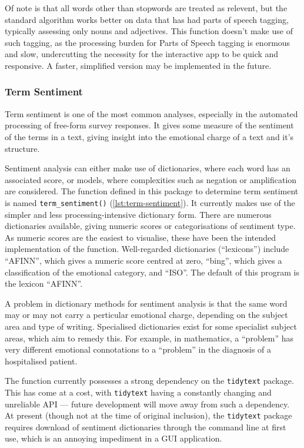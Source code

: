 \documentclass[11pt, a4paper, titlepage]{report}
\begin{document}
Of note is that all words other than stopwords are treated as
relevent, but the standard algorithm works better on data that has had
parts of speech tagging, typically assessing only nouns and
adjectives. This function doesn't make use of such tagging, as the
processing burden for Parts of Speech tagging is enormous and slow,
undercutting the necessity for the interactive app to be quick and
responsive. A faster, simplified version may be implemented in the
future.

\subsubsection{Term Sentiment}\label{sec:term-sentiment}

Term sentiment is one of the most common analyses, especially in the
automated processing of free-form survey responses. It gives some
measure of the sentiment of the terms in a text, giving insight into
the emotional charge of a text and it's structure.

Sentiment analysis can either make use of dictionaries, where each
word has an associated score, or models, where complexities such as
negation or amplification are considered. The function defined in this
package to determine term sentiment is named
\texttt{term_sentiment()}
(\underline{\cref{lst:term-sentiment}}). It currently makes use of the
simpler and less processing-intensive dictionary form. There are
numerous dictionaries available, giving numeric scores or
categorisations of sentiment type. As numeric scores are the easiest
to visualise, these have been the intended implementation of the
function. Well-regarded dictionaries (``lexicons'') include ``AFINN'',
which gives a numeric score centred at zero, ``bing'', which gives a
classification of the emotional category, and ``ISO''. The default of
this program is the lexicon ``AFINN''.

A problem in dictionary methods for sentiment analysis is that the
same word may or may not carry a perticular emotional charge,
depending on the subject area and type of writing. Specialised
dictionaries exist for some specialist subject areas, which aim to
remedy this. For example, in mathematics, a ``problem'' has very
different emotional connotations to a ``problem'' in the diagnosis of
a hospitalised patient.

The function currently possesses a strong dependency on the \texttt{tidytext}
package. This has come at a cost, with \texttt{tidytext} having a constantly
changing and unreliable API --- future development will move away from
such a dependency. At present (though not at the time of original
inclusion), the \texttt{tidytext} package requires download of sentiment
dictionaries through the command line at first use, which is an
annoying impediment in a GUI application.
\end{document}
